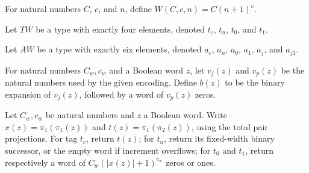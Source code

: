 \begin{definition}
\label{Complexity.Meyer.wd}
\leanok
For natural numbers $C$, $c$, and $n$, define $W(C,c,n)=C(n+1)^c$.
\end{definition}

\begin{definition}
\label{Complexity.Meyer.TW}
\leanok
Let $TW$ be a type with exactly four elements, denoted $t_c$, $t_n$, $t_0$, and $t_1$.
\end{definition}

\begin{definition}
\label{Complexity.Meyer.AW}
\leanok
Let $AW$ be a type with exactly six elements, denoted $a_c$, $a_n$, $a_0$, $a_1$, $a_j$,
and $a_{j1}$.
\end{definition}

\begin{definition}
\label{Complexity.Meyer.bjw}
\leanok
{}
For natural numbers $C_w,c_w$ and a Boolean word $z$, let $v_j(z)$ and $v_p(z)$ be the
natural numbers used by the given encoding. Define $b(z)$ to be the binary expansion of
$v_j(z)$, followed by a word of $v_p(z)$ zeros.
\end{definition}

\begin{definition}
\label{Complexity.Meyer.twd}
\leanok
{}
Let $C_w,c_w$ be natural numbers and $z$ a Boolean word. Write $x(z)=\pi_1(\pi_1(z))$
and $t(z)=\pi_1(\pi_2(z))$, using the total pair projections. For tag $t_c$, return
$t(z)$; for $t_n$, return its fixed-width binary successor, or the empty word if
increment overflows; for $t_0$ and $t_1$, return respectively a word of
$C_w(|x(z)|+1)^{c_w}$ zeros or ones.
\end{definition}

